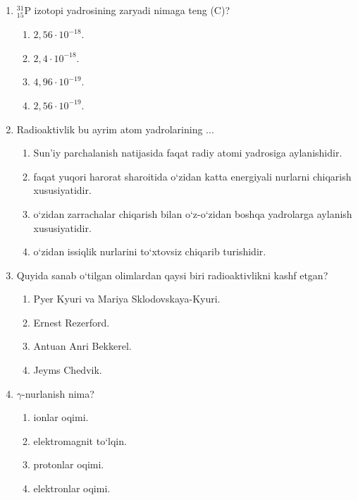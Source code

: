\begin{enumerate}
\begin{enumerate}[label=\Alph*)]
\item kislorod $^{16}_8\text{O}$.
\item azot $^{14}_7\text{N}$.
\item kislorod izotopi $^{17}_8\text{O}$.
\item ftor $^{19}_9\text{F}$.
\end{enumerate}

\item $^{31}_{15}\text{P}$ izotopi yadrosining zaryadi nimaga teng (C)?
\begin{enumerate}[label=\Alph*)]
\item $2,56\cdot 10^{-18}$.
\item $2,4\cdot 10^{-18}$.
\item $4,96\cdot 10^{-19}$.
\item $2,56\cdot 10^{-19}$.
\end{enumerate}

\item Radioaktivlik bu ayrim atom yadrolarining ...
\begin{enumerate}[label=\Alph*)]
\item Sun’iy parchalanish natijasida faqat radiy atomi yadrosiga aylanishidir.
\item faqat yuqori harorat sharoitida o‘zidan katta energiyali nurlarni chiqarish xususiyatidir.
\item o‘zidan zarrachalar chiqarish bilan o‘z-o‘zidan boshqa yadrolarga aylanish xususiyatidir.
\item o‘zidan issiqlik nurlarini to‘xtovsiz chiqarib turishidir.
\end{enumerate}

\item Quyida sanab o‘tilgan olimlardan qaysi biri radioaktivlikni kashf etgan?
\begin{enumerate}[label=\Alph*)]
\item Pyer Kyuri va Mariya Sklodovskaya-Kyuri.
\item Ernest Rezerford.
\item Antuan Anri Bekkerel.
\item Jeyms Chedvik.
\end{enumerate}

\item $\gamma$-nurlanish nima?
\begin{enumerate}[label=\Alph*)]
\item ionlar oqimi.
\item elektromagnit to‘lqin.
\item protonlar oqimi.
\item elektronlar oqimi.
\end{enumerate}


\end{enumerate}

